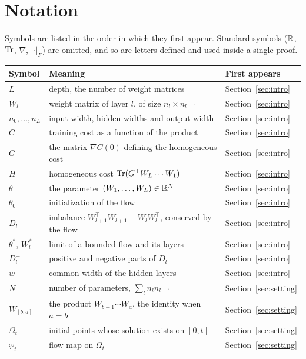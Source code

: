 \section{Notation}\label{app:notation}
Symbols are listed in the order in which they first appear. Standard symbols ($\mathbb{R}$, $\operatorname{Tr}$, $\nabla$, $|\cdot|_F$) are omitted, and so are letters defined and used inside a single proof.

\begin{center}\small\begin{tabular}{@{}lp{}l@{}}\toprule
Symbol & Meaning & First appears \\ \midrule
$L$ & depth, the number of weight matrices & Section~\ref{sec:intro} \\
$W_l$ & weight matrix of layer $l$, of size $n_l\times n_{l-1}$ & Section~\ref{sec:intro} \\
$n_0,\dots,n_L$ & input width, hidden widths and output width & Section~\ref{sec:intro} \\
$C$ & training cost as a function of the product & Section~\ref{sec:intro} \\
$G$ & the matrix $\nabla C(0)$ defining the homogeneous cost & Section~\ref{sec:intro} \\
$H$ & homogeneous cost $\operatorname{Tr}(G^\top W_L\cdots W_1)$ & Section~\ref{sec:intro} \\
$\theta$ & the parameter $(W_1,\dots,W_L)\in\mathbb{R}^N$ & Section~\ref{sec:intro} \\
$\theta_0$ & initialization of the flow & Section~\ref{sec:intro} \\
$D_l$ & imbalance $W_{l+1}^\top W_{l+1}-W_lW_l^\top$, conserved by the flow & Section~\ref{sec:intro} \\
$\theta^*$, $W_l^*$ & limit of a bounded flow and its layers & Section~\ref{sec:intro} \\
$D_l^\pm$ & positive and negative parts of $D_l$ & Section~\ref{sec:intro} \\
$w$ & common width of the hidden layers & Section~\ref{sec:intro} \\
$N$ & number of parameters, $\sum_ln_ln_{l-1}$ & Section~\ref{sec:setting} \\
$W_{[b,a]}$ & the product $W_{b-1}\cdots W_a$, the identity when $a=b$ & Section~\ref{sec:setting} \\
$\Omega_t$ & initial points whose solution exists on $[0,t]$ & Section~\ref{sec:setting} \\
$\varphi_t$ & flow map on $\Omega_t$ & Section~\ref{sec:setting} \\

\end{tabular}
\end{center}
